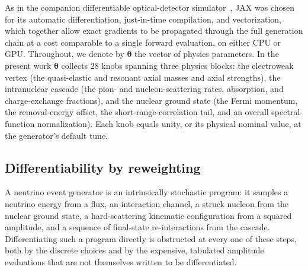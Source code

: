 \documentclass[aps,prd,reprint,superscriptaddress,nofootinbib,amsmath,amssymb,floatfix]{revtex4-1}
\begin{document}
As in the companion differentiable optical-detector simulator~\cite{LUCiD}, JAX
was chosen for its automatic differentiation, just-in-time compilation, and
vectorization, which together allow exact gradients to be propagated through the
full generation chain at a cost comparable to a single forward evaluation, on
either CPU or GPU. Throughout, we denote by $\bm\theta$ the vector of physics
parameters. In the present work $\bm\theta$ collects $28$ knobs spanning three
physics blocks: the electroweak vertex (the quasi-elastic and resonant axial
masses and axial strengths), the intranuclear cascade (the pion- and
nucleon-scattering rates, absorption, and charge-exchange fractions), and the
nuclear ground state (the Fermi momentum, the removal-energy offset, the
short-range-correlation tail, and an overall spectral-function normalization).
Each knob equals unity, or its physical nominal value, at the generator's default
tune.

\subsection{Differentiability by reweighting}
\label{sec:adonis_reweighting}

A neutrino event generator is an intrinsically stochastic program: it samples a
neutrino energy from a flux, an interaction channel, a struck nucleon from the
nuclear ground state, a hard-scattering kinematic configuration from a squared
amplitude, and a sequence of final-state re-interactions from the cascade.
Differentiating such a program directly is obstructed at every one of these
steps, both by the discrete choices and by the expensive, tabulated amplitude
evaluations that are not themselves written to be differentiated.
\end{document}
